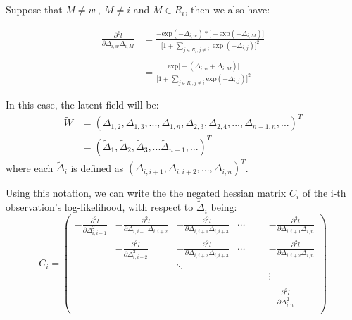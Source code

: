 \documentclass[]{article}
\begin{document}
Suppose that \(M\ne w \ , \ M\neq i\) and \(M\in R_i\), then we also
have:

\begin{equation}\begin{aligned}\label{eqn:secderivofPart3}
\frac{\partial^2 l}{\partial \Delta_{i,w} \Delta_{i,M}} &= \frac{-\text{exp}(-\Delta_{i,w})*\big[-\text{exp}(-\Delta_{i,M})\big]}{\big[1+\sum_{j\in R_i,j \ne i}\exp(-\Delta_{i,j})\big]^2}\\
   \\
                                                      &= \frac{\text{exp}\big[-(\Delta_{i,w}+\Delta_{i,M})\big]}{\big[1+\sum_{j\in R_i,j \ne i}\text{exp}(-\Delta_{i,j})\big]^2}
\end{aligned}\end{equation}

In this case, the latent field will be:
\begin{equation}\begin{aligned}\label{eqn:latenforpartial}
\tilde{W} &= (\Delta_{1,2},\Delta_{1,3},...,\Delta_{1,n},\Delta_{2,3},\Delta_{2,4},...,\Delta_{n-1,n},...)^T \\
          &= (\tilde{\Delta}_1,\tilde{\Delta}_2,\tilde{\Delta}_3,...\tilde{\Delta}_{n-1},...)^T
\end{aligned}\end{equation} where each \(\tilde{\Delta}_i\) is defined
as \((\Delta_{i,i+1},\Delta_{i,i+2},...,\Delta_{i,n})^T\).

Using this notation, we can write the the negated hessian matrix \(C_i\)
of the i-th observation's log-likelihood, with respect to
\(\tilde{\Delta}_i\) being: \begin{equation}
C_i = \begin{pmatrix} 
-\frac{\partial^2 l}{\partial \Delta_{i,i+1}^2} & -\frac{\partial^2 l}{\partial \Delta_{i,i+1} \Delta_{i,i+2}} & -\frac{\partial^2 l}{\partial \Delta_{i,i+1} \Delta_{i,i+3}} & \cdots & & & -\frac{\partial^2 l}{\partial \Delta_{i,i+1} \Delta_{i,n}} \\ 
 & -\frac{\partial^2 l}{\partial \Delta_{i,i+2}^2} & -\frac{\partial^2 l}{\partial \Delta_{i,i+2} \Delta_{i,i+3}} & \cdots & & & -\frac{\partial^2 l}{\partial \Delta_{i,i+2} \Delta_{i,n}} \\
  &  & \ddots &  & & \\
& & & &  & & \vdots \\ 
& & & &  & & \\
& & & & & & -\frac{\partial^2 l}{\partial \Delta_{i,n}^2}\\
\end{pmatrix}
\end{equation}
\end{document}

